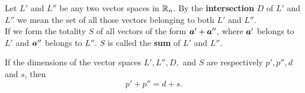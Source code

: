 Let $L'$ and $L''$ be any two vector spaces in $\mathbb{R}_n$. By the {\bf intersection} $D$ of $L'$ and $L''$ we mean the set of all those vectors belonging to both $L'$ and $L''$.\\

If we form the totality $S$ of all vectors of the form $\boldsymbol{a}' + \boldsymbol{a}''$, where $\boldsymbol{a}'$ belongs to $L'$ and $\boldsymbol{a}''$ belongs to $L''$. $S$ is called the {\bf sum} of $L'$ and $L''$.

\begin{theorem}
If the dimensions of the vector spaces $L', L'', D,$ and $S$ are respectively $p', p'', d$ and $s$, then $$p' + p'' = d + s.$$\label{Th2_7}
\end{theorem}